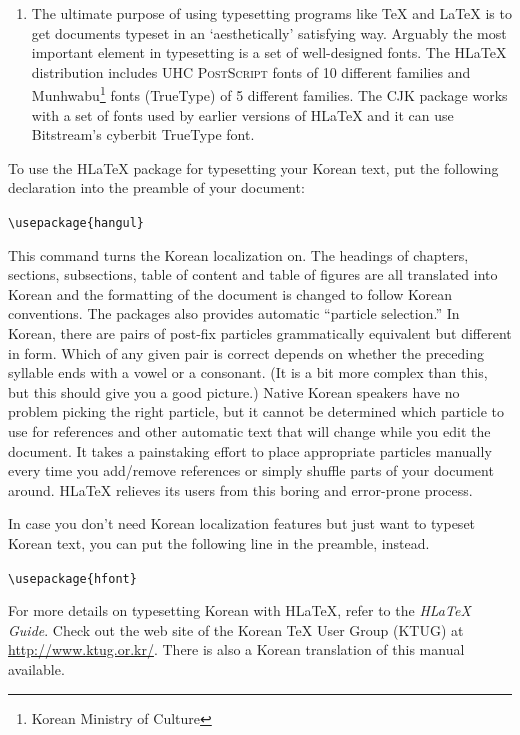 \documentclass[twoside,letterpaper,11pt]{article}
\begin{document}
\begin{enumerate}
The CJK package is not specific to Korean. It can
process input files in UTF-8 as well as in various CJK encodings
including EUC-KR and CP949/Windows-949/UHC, it can be used to typeset documents with
multilingual content (especially Chinese, Japanese and Korean).
The CJK package has no Korean localization such as the one offered by H\LaTeX{} and it
does not come with as many special Korean fonts as H\LaTeX.

\item The ultimate purpose of using typesetting programs like \TeX{}
and \LaTeX{} is to get documents typeset in an `aesthetically' satisfying way.
Arguably the most important element in typesetting is  a set of
well-designed fonts. The H\LaTeX{} distribution
includes UHC \textsc{PostScript} fonts 
of 10
different families and
Munhwabu\footnote{Korean Ministry of Culture}
fonts (TrueType) of 5 different families.
The CJK package works with a set of fonts used by earlier versions
of H\LaTeX{} and it can use Bitstream's cyberbit TrueType
font.
\end{enumerate}

To use the  H\LaTeX{} package for typesetting your Korean text, put the following
declaration into the preamble of your document:
\begin{lscommand}
\verb+\usepackage{hangul}+
\end{lscommand}

This command turns the Korean localization on. The headings
of chapters, sections, subsections, table of content and table of
figures are all translated into Korean and the formatting of the document
is changed to follow Korean conventions. 
The packages also provides automatic ``particle selection.''
In Korean, there are pairs of post-fix particles 
grammatically equivalent but different in form. Which 
of any given pair is correct depends on 
whether the preceding syllable ends with a  vowel or a consonant.
(It is a bit more complex than this, but this should give you
a good picture.)
Native Korean speakers have no problem picking the right particle, but
it cannot be determined which particle to use for references and other automatic
text that will change while you edit the document.
It 
takes a painstaking effort to place appropriate particles manually
every time you add/remove references or simply shuffle  parts
of your document around.
H\LaTeX{} relieves its users from this boring and error-prone process.

In case you don't need Korean localization features
but just want 
to  typeset Korean text, you can put the following line in the 
preamble, instead.
\begin{lscommand}
\verb+\usepackage{hfont}+
\end{lscommand}

For more details on typesetting  Korean with H\LaTeX{}, refer to
the \emph{H\LaTeX{} Guide}.  Check out the web site of the Korean
\TeX{} User Group (KTUG) at  \url{http://www.ktug.or.kr/}.
There is also a Korean translation
of this manual available.

\fi
\end{document}

